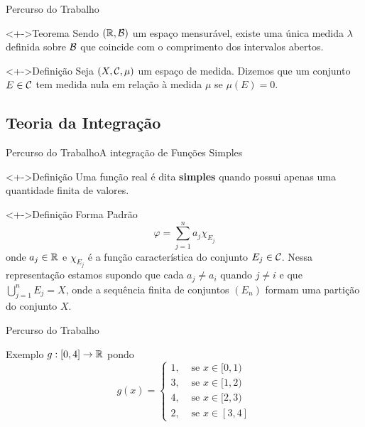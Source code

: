 	\begin{frame}{Percurso do Trabalho}
		\begin{block}<+->{Teorema}
			\justify Sendo $(\operatorname{\mathbb{R}}, \operatorname{\mathcal{B}})$ um espaço mensurável, existe uma única medida $\lambda$ definida sobre $\operatorname{\mathcal{B}}$ que coincide com o comprimento dos intervalos abertos.
		\end{block}
		\begin{block}<+->{Definição}
			\justify Seja $(X, \operatorname{\mathcal{C}}, \mu)$ um espaço de medida.
			Dizemos que um conjunto $E \in \operatorname{\mathcal{C}}$ tem medida nula em relação à medida $\mu$ se $\mu(E) = 0$.
		\end{block}
	\end{frame}

	\subsection{Teoria da Integração}
	\begin{frame}{Percurso do Trabalho}{A integração de Funções Simples}
		\begin{block}<+->{Definição}
			\justify Uma função real é dita \textbf{simples} quando possui apenas uma quantidade finita de valores.
		\end{block}
	\end{frame}
	\begin{frame}
		\begin{block}<+->{Definição}
			\justify Forma Padrão
			$$
			\varphi =  \sum_{j = 1}^n a_j\chi_{E_j}
			$$
			onde $a_j \in \operatorname{\mathbb{R}}$ e $\chi_{E_j}$ é a função característica do conjunto $E_j \in \operatorname{\mathcal{C}}$.
			Nessa representação estamos supondo que cada $a_j \neq a_i$ quando $j \neq i$ e que
			$\displaystyle \bigcup_{j = 1}^n E_j = X$, onde a sequência finita de conjuntos $(E_n)$ formam uma partição do conjunto $X$.
		\end{block}
	\end{frame}
	\begin{frame}{Percurso do Trabalho}
		\begin{block}{Exemplo}
			$g: [0,4] \to \operatorname{\mathbb{R}}$ pondo 
			$$g(x) = \left\{
			\begin{array}{cc}
				1, & \textrm{\ se } x \in [0,1) \\
				3, & \textrm{\ se } x \in [1,2) \\
				4, & \textrm{\ se } x \in [2,3) \\
				2, & \textrm{\ se } x \in [3,4]
			\end{array}\right.
			$$
		\end{block}
	\end{frame}
